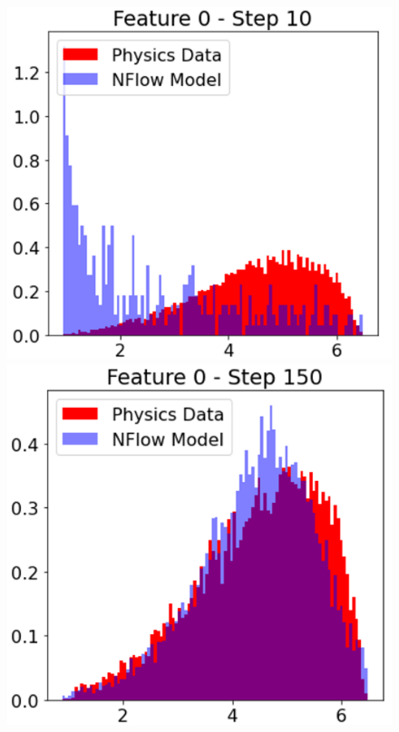 \begin{figure}[!ht]
    \centering
    \begin{minipage}{.25\textwidth}
    
        \centering
        \includegraphics[width=.9\textwidth,trim={0 0 0 0},clip]{pictures/milestoneR2/steps/s10.png}
        \includegraphics[width=.9\textwidth,trim={0 0 0 0},clip]{pictures/milestoneR2/steps/s150.png}
    \end{minipage}%
    \begin{minipage}{0.25\textwidth}
    

\end{minipage}
\end{figure}
